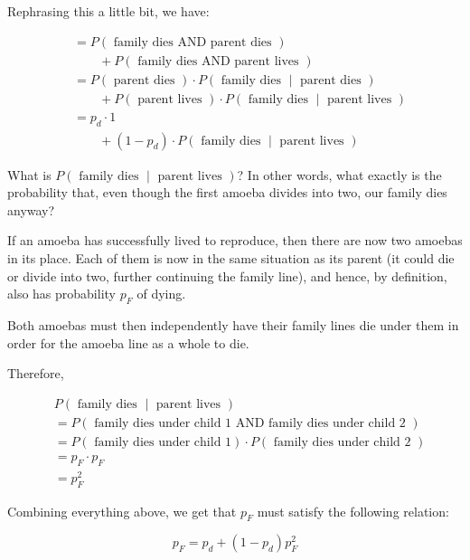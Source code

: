 Rephrasing this a little bit, we have:

\begin{align*}
&= P(\text{ family dies AND parent dies }) \\
&\qquad + P(\text{ family dies AND parent lives }) \\
&= P(\text{ parent dies }) \cdot P\left(\text{ family dies } \middle| \text{ parent dies }\right) \\
&\qquad + P(\text{ parent lives }) \cdot P\left(\text{ family dies } \middle| \text{ parent lives }\right) \\
&= p_d \cdot 1 \\
&\qquad + (1 - p_d) \cdot P\left(\text{ family dies } \middle| \text{ parent lives }\right)
\end{align*}

What is $P\left(\text{ family dies } \middle| \text{ parent lives }\right)$? In other words, what exactly is the probability that, even though the first amoeba divides into two, our family dies anyway?

If an amoeba has successfully lived to reproduce, then there are now two amoebas in its place. Each of them is now in the same situation as its parent (it could die or divide into two, further continuing the family line), and hence, by definition, also has probability $p_F$ of dying. 

Both amoebas must then independently have their family lines die under them in order for the amoeba line as a whole to die.

Therefore, 

\begin{align*}
&P\left(\text{ family dies } \middle| \text{ parent lives }\right) \\
&= P\left(\text{ family dies under child 1 AND family dies under child 2 } \right) \\
&= P\left(\text{ family dies under child 1} \right) \cdot P\left(\text{ family dies under child 2 } \right) \\
&= p_F \cdot p_F \\
&= p_F^2
\end{align*}


Combining everything above, we get that $p_F$ must satisfy the following relation:

\begin{equation}
p_F = p_d + (1-p_d)p_F^2
\end{equation}

